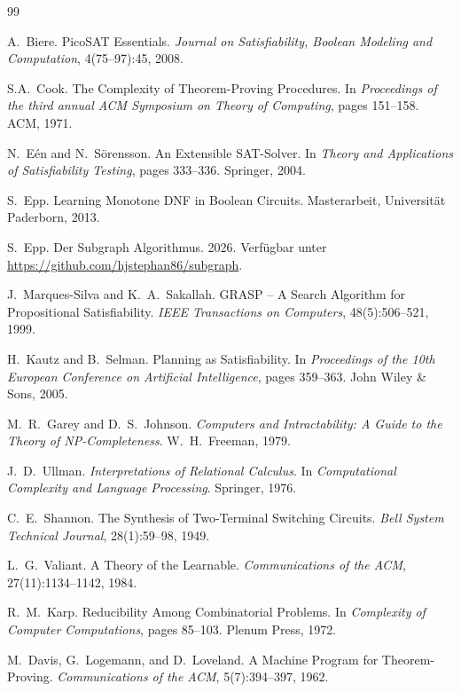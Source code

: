 ﻿\documentclass[a4paper,12pt]{article}
\theoremstyle{definition}
\begin{document}
\begin{thebibliography}{99}

A.\ Biere. PicoSAT Essentials. \textit{Journal on Satisfiability, Boolean Modeling and Computation}, 4(75--97):45, 2008.

S.A.\ Cook. The Complexity of Theorem-Proving Procedures. In \textit{Proceedings of the third annual ACM Symposium on Theory of Computing}, pages 151--158. ACM, 1971.

N.\ Eén and N.\ Sörensson. An Extensible SAT-Solver. In \textit{Theory and Applications of Satisfiability Testing}, pages 333--336. Springer, 2004.

S.\ Epp. Learning Monotone DNF in Boolean Circuits. Masterarbeit, Universität Paderborn, 2013.

S.\ Epp. Der Subgraph Algorithmus. 2026. Verfügbar unter \url{https://github.com/hjstephan86/subgraph}.

J.\ Marques-Silva and K.\ A.\ Sakallah. GRASP -- A Search Algorithm for Propositional Satisfiability. \textit{IEEE Transactions on Computers}, 48(5):506--521, 1999.

H.\ Kautz and B.\ Selman. Planning as Satisfiability. In \textit{Proceedings of the 10th European Conference on Artificial Intelligence}, pages 359--363. John Wiley \& Sons, 2005.

M.\ R.\ Garey and D.\ S.\ Johnson. \textit{Computers and Intractability: A Guide to the Theory of NP-Completeness}. W.\ H.\ Freeman, 1979.

J.\ D.\ Ullman. \textit{Interpretations of Relational Calculus}. In \textit{Computational Complexity and Language Processing}. Springer, 1976.

C.\ E.\ Shannon. The Synthesis of Two-Terminal Switching Circuits. \textit{Bell System Technical Journal}, 28(1):59--98, 1949.

L.\ G.\ Valiant. A Theory of the Learnable. \textit{Communications of the ACM}, 27(11):1134--1142, 1984.

R.\ M.\ Karp. Reducibility Among Combinatorial Problems. In \textit{Complexity of Computer Computations}, pages 85--103. Plenum Press, 1972.

M.\ Davis, G.\ Logemann, and D.\ Loveland. A Machine Program for Theorem-Proving. \textit{Communications of the ACM}, 5(7):394--397, 1962.


\end{thebibliography}
\end{document}
